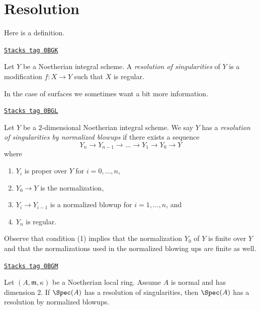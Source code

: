 \section{Resolution}
\label{resolve-section-resolution}
Here is a definition.

\begin{definition}[Resolution]
\label{resolve-definition-resolution}
\href{https://stacks.math.columbia.edu/tag/0BGK}{\texttt{Stacks tag 0BGK}}

Let $Y$ be a Noetherian integral scheme. A {\it resolution of singularities}
of $Y$ is a modification $f : X \to Y$ such that $X$ is regular.
\end{definition}

In the case of surfaces we sometimes want a bit more information.

\begin{definition}
\label{resolve-definition-resolution-surface}
\href{https://stacks.math.columbia.edu/tag/0BGL}{\texttt{Stacks tag 0BGL}}

Let $Y$ be a $2$-dimensional Noetherian integral scheme.
We say $Y$ has a {\it resolution of singularities by normalized blowups}
if there exists a sequence
$$
Y_n \to Y_{n - 1} \to \ldots \to Y_1 \to Y_0 \to Y
$$
where
\begin{enumerate}
\item $Y_i$ is proper over $Y$ for $i = 0, \ldots, n$,
\item $Y_0 \to Y$ is the normalization,
\item $Y_i \to Y_{i - 1}$ is a normalized blowup for $i = 1, \ldots, n$, and
\item $Y_n$ is regular.
\end{enumerate}
\end{definition}

Observe that condition (1) implies that the normalization
$Y_0$ of $Y$ is finite over $Y$ and that the normalizations
used in the normalized blowing ups are finite as well.

\begin{lemma}
\label{resolve-lemma-existence-implies-existence-by-normalized-blowing-ups}
\href{https://stacks.math.columbia.edu/tag/0BGM}{\texttt{Stacks tag 0BGM}}

Let $(A, \mathfrak m, \kappa)$ be a Noetherian local ring.
Assume $A$ is normal and has dimension $2$.
If $\Spec(A)$ has a resolution of singularities,
then $\Spec(A)$ has a resolution by normalized blowups.
\end{lemma}

